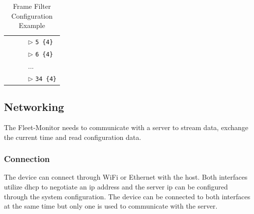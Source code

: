 \begin{table}[h!]
\begin{center}
{\begin{tabular}{p{0.0cm} p{0.1cm} p{0.1cm} p{0.1cm} p{7.0cm}}
        & & & \multicolumn{2}{l}{$\rhd$ \texttt{5 \{4\}}}                                                   \\[0.3em]
        & & & \multicolumn{2}{l}{$\rhd$ \texttt{6 \{4\}}}                                                   \\[0.3em]
        & & & \multicolumn{2}{l}{...}                                                                       \\[0.3em]
        & & & \multicolumn{2}{l}{$\rhd$ \texttt{34 \{4\}}}                                                  \\[0.4em]
        \end{tabular}
    }
    \end{center}
\vspace{-0.3cm}
\caption{\label{fig:frame-configuration-example}Frame Filter Configuration Example}
\end{table}
\newpage

\subsection{Networking}  \label{Networking}
The Fleet-Monitor needs to communicate with a server to stream data, exchange the current time and read configuration data. 
\subsubsection{Connection}
The device can connect through WiFi or Ethernet with the host. Both interfaces utilize \acrshort{dhcp} to negotiate an \acrshort{ip} address and the server \acrshort{ip} can be configured through the system configuration. The device can be connected to both interfaces at the same time but only one is used to communicate with the server. 

